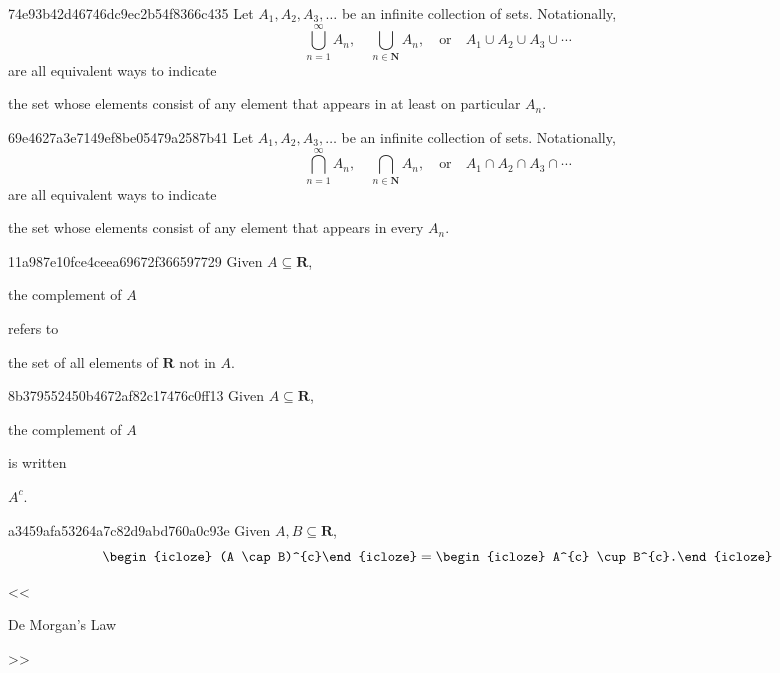 \begin{note}{74e93b42d46746dc9ec2b54f8366c435}
    Let \({ A_1, A_2, A_3, \ldots }\) be an infinite collection of sets.
    Notationally,
    \[
        \bigcup_{n = 1}^{\infty} A_n, \quad \bigcup_{n \in \mathbf{N}}^{} A_n, \quad \text{or} \quad A_1 \cup A_2 \cup A_3 \cup \cdots
    \]
    are all equivalent ways to indicate \begin{icloze}{1}the set whose elements consist of any element that appears in at least on particular \({ A_n }\).\end{icloze}
\end{note}

\begin{note}{69e4627a3e7149ef8be05479a2587b41}
    Let \({ A_1, A_2, A_3, \ldots }\) be an infinite collection of sets.
    Notationally,
    \[
        \bigcap_{n = 1}^{\infty} A_n, \quad \bigcap_{n \in \mathbf{N}}^{} A_n, \quad \text{or} \quad A_1 \cap A_2 \cap A_3 \cap \cdots
    \]
    are all equivalent ways to indicate \begin{icloze}{1}the set whose elements consist of any element that appears in every \({ A_n }\).\end{icloze}
\end{note}

\begin{note}{11a987e10fce4ceea69672f366597729}
    Given \({ A \subseteq \mathbf{R} }\), \begin{icloze}{2}the complement of \({ A }\)\end{icloze} refers to \begin{icloze}{1}the set of all elements of \({ \mathbf{R} }\) not in \({ A }\).\end{icloze}
\end{note}

\begin{note}{8b379552450b4672af82c17476c0ff13}
    Given \({ A \subseteq \mathbf{R} }\), \begin{icloze}{2}the complement of \({ A }\)\end{icloze} is written \begin{icloze}{1}\({ A^{c} }\).\end{icloze}
\end{note}

\begin{note}{a3459afa53264a7c82d9abd760a0c93e}
    Given \({ A, B \subseteq \mathbf{R} }\),
    \[
        \begin{icloze}{2}(A \cap B)^{c}\end{icloze} = \begin{icloze}{1}A^{c} \cup B^{c}.\end{icloze}
    \]

    \begin{center}
        \tiny
        <<\begin{icloze}{3}De Morgan's Law\end{icloze}>>
    \end{center}
\end{note}

